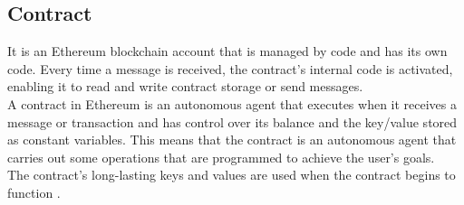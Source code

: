 \subsection{Contract}
It is an Ethereum blockchain account that is managed by code and has its own code. Every time a message is received, the contract's internal code is activated, enabling it to read and write contract storage or send messages.\\
A contract in Ethereum is an autonomous agent that executes when it receives a message or transaction and has control over its balance and the key/value stored as constant variables. This means that the contract is an autonomous agent that carries out some operations that are programmed to achieve the user's goals. \\
The contract's long-lasting keys and values are used when the contract begins to function \cite{Egbertsen}.

